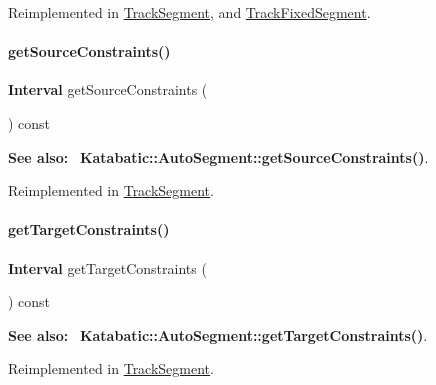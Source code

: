Reimplemented in \hyperlink{classKite_1_1TrackSegment_a034711e2d3617ea848ef9f5a18255e10}{Track\+Segment}, and \hyperlink{classKite_1_1TrackFixedSegment_a034711e2d3617ea848ef9f5a18255e10}{Track\+Fixed\+Segment}.

\mbox{\label{classKite_1_1TrackElement_a48f8b54f9489da3778d85c382a483f81}} 
\paragraph{\texorpdfstring{get\+Source\+Constraints()}{getSourceConstraints()}}
{\footnotesize\ttfamily \textbf{ Interval} get\+Source\+Constraints (\begin{DoxyParamCaption}{ }\end{DoxyParamCaption}) const\hspace{0.3cm}{\ttfamily [virtual]}}

{\bfseries See also\+:}~ \textbf{ Katabatic\+::\+Auto\+Segment\+::get\+Source\+Constraints()}. 

Reimplemented in \hyperlink{classKite_1_1TrackSegment_a48f8b54f9489da3778d85c382a483f81}{Track\+Segment}.

\mbox{\label{classKite_1_1TrackElement_a69af7d4287bc0e44c9ca2c8e6f692be9}} 
\paragraph{\texorpdfstring{get\+Target\+Constraints()}{getTargetConstraints()}}
{\footnotesize\ttfamily \textbf{ Interval} get\+Target\+Constraints (\begin{DoxyParamCaption}{ }\end{DoxyParamCaption}) const\hspace{0.3cm}{\ttfamily [virtual]}}

{\bfseries See also\+:}~ \textbf{ Katabatic\+::\+Auto\+Segment\+::get\+Target\+Constraints()}. 

Reimplemented in \hyperlink{classKite_1_1TrackSegment_a69af7d4287bc0e44c9ca2c8e6f692be9}{Track\+Segment}.

